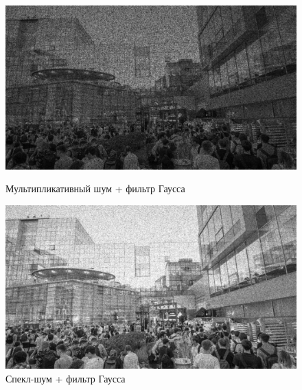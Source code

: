 \documentclass[a4paper]{article}
\begin{document}
\begin{figure}[H]
    \begin{minipage}{0.49\textwidth}
        \centering \includegraphics[width=\textwidth]{images/2_low_filters/multiplicative - gaussian (ksize=(3, 3), sigmaX=0).jpg}
        \caption{Мультипликативный шум + фильтр Гаусса}
    \end{minipage}\hfill
    \begin{minipage}{0.49\textwidth}
        \centering \includegraphics[width=\textwidth]{images/2_low_filters/speckle - gaussian (ksize=(3, 3), sigmaX=0).jpg}
        \caption{Спекл-шум + фильтр Гаусса}
    \end{minipage}
\end{figure}
\end{document}
